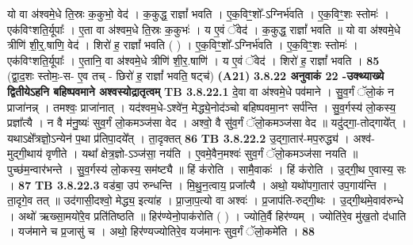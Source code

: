 \documentclass[17pt]{extarticle}
\begin{document}
{{{{{{{{{{{{{{{{{{{{{{                  यो वा अ॑श्वमे॒धे ति॒स्रः क॒कुभो॒ वेद॑ । क॒कुद्ध॒ राज्ञां᳚ भवति । ए॒क॒विꣳ॒॒शो᳚-ऽग्निर्भ॑वति । ए॒क॒विꣳ॒॒शः स्तोमः॑ । एक॑विꣳशति॒र्यूपाः᳚ । ए॒ता वा अ॑श्वम॒धे ति॒स्रः क॒कुभः॑ । य ए॒वं ॅवेद॑ । क॒कुद्ध॒ राज्ञां᳚ भवति ॥ यो वा अ॑श्वमे॒धे त्रीणि॑ शी॒र्॒.षाणि॒ वेद॑ । शिरो॑ ह॒ राज्ञां᳚ भवति ( ) । ए॒क॒विꣳ॒॒शो᳚-ऽग्निर्भ॑वति । ए॒क॒विꣳ॒॒शः स्तोमः॑ । एक॑विꣳशति॒र्यूपाः᳚ । ए॒तानि॒ वा अ॑श्वमे॒धे त्रीणि॑ शी॒र॒.षाणि॑ । य ए॒वं ॅवेद॑ । शिरो॑ ह॒ राज्ञां᳚ भवति । \textbf{ 85} \newline
                  \newline
                                    (द्वा॒द॒शः स्तोमः॒-स- ए॒व तच् - छिरो॑ ह॒ राज्ञां᳚ भवति॒ षट्च॑) \textbf{(A21)} \newline \newline
                \textbf{ 3.8.22    अनुवाकं   22 -उक्थ्याख्ये द्वितीयेऽहनि बहिष्पवमाने अश्वस्योद्रातृत्वम्} \newline
                                \textbf{ TB 3.8.22.1} \newline
                  दे॒वा वा अ॑श्वमे॒धे पव॑माने । सु॒व॒र्गं ॅलो॒कं न प्राजा॑नन्न् । तमश्वः॒ प्राजा॑नात् । यद॑श्वम॒धे-ऽश्वे॑न॒ मेद्ध्ये॒नोद॑ञ्चो बहिष्पवमा॒नꣳ सर्प॑न्ति । सु॒व॒र्गस्य॑ लो॒कस्य॒ प्रज्ञा᳚त्यै । न वै म॑नु॒ष्यः॑ सुव॒र्गं लो॒कमञ्ज॑सा वेद । अश्वो॒ वै सु॑व॒र्गं ॅलो॒कमञ्ज॑सा वेद ॥ यदु॑द्गा॒-तोद्गाये᳚त् । यथाऽक्षे᳚त्रज्ञो॒ऽन्येन॑ प॒था प्र॑तिपा॒दये᳚त् । ता॒दृक्तत् \textbf{ 86} \newline
                  \newline
                                \textbf{ TB 3.8.22.2} \newline
                  उ॒द्गा॒तार॑-मप॒रुद्ध्य॑ । अश्व॑-मुद्गी॒थाय॑ वृणीते । यथा᳚ क्षेत्र॒ज्ञो-ऽञ्ज॑सा॒ नय॑ति । ए॒वमे॒वैन॒मश्वः॑ सुव॒र्गं ॅलो॒कमञ्ज॑सा नयति ॥ पुच्छ॑म॒न्वार॑भन्ते । सु॒व॒र्गस्य॑ लो॒कस्य॒ सम॑ष्ट्यै ॥ हिं क॑रोति । सामै॒वाकः॑ । हिं क॑रोति । उ॒द्गी॒थ ए॒वास्य॒ सः । \textbf{ 87} \newline
                  \newline
                                \textbf{ TB 3.8.22.3} \newline
                  वड॑बा॒ उप॑ रुन्धन्ति । मि॒थु॒न॒त्वाय॒ प्रजा᳚त्यै । अथो॒ यथो॑पगा॒तार॑ उप॒गाय॑न्ति । ता॒दृगे॒व तत् ॥ उद॑गासी॒दश्वो॒ मेद्ध्य॒ इत्या॑ह । प्रा॒जा॒प॒त्यो वा अश्वः॑ । प्र॒जाप॑ति-रुद्गी॒थः । उ॒द्गी॒थमे॒वाव॑रुन्धे । अथो॑ ऋख्सा॒मयो॑रे॒व प्रति॑तिष्ठति ॥ हिर॑ण्येनो॒पाक॑रोति ( ) । ज्योति॒र्वै हिर॑ण्यम् । ज्योति॑रे॒व मु॑ख॒तो द॑धाति । यज॑माने च प्र॒जासु॑ च । अथो॒ हिर॑ण्यज्योतिरे॒व यज॑मानः सुव॒र्गं ॅलो॒कमे॑ति । \textbf{ 88} \newline
}}}}}}}}}}}}}}}}}}}}}}
\end{document}
